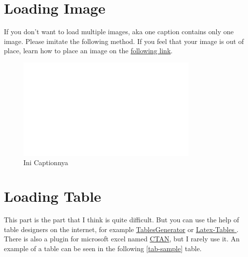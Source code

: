 \documentclass[11pt,a4paper]{article}
\begin{document}
\section{Loading Image}
If you don't want to load multiple images, aka one caption contains only one image. Please imitate the following method. If you feel that your image is out of place, learn how to place an image on the \href{https://www.overleaf.com/learn/latex/Positioning_of_Figures}{following link}.
\begin{figure}[h]
    \centering
    \includegraphics[width=0.8\textwidth]{Figure/ifitera-header.png}
    \caption{Ini Captionnya}
    \label{fig:my_label}
\end{figure}

\section{Loading Table}
This part is the part that I think is quite difficult. But you can use the help of table designers on the internet, for example \href{https://www.tablesgenerator.com}{TablesGenerator} or \href{https://www.latex-tables.com}{Latex-Tables }. There is also a plugin for microsoft excel named \href{https://ctan.org/tex-
	archive/support/excel2latex?lang=en}{CTAN}, but I rarely use it. An example of a table can be seen in the following \ref{tab-sample} table.
\end{document}
